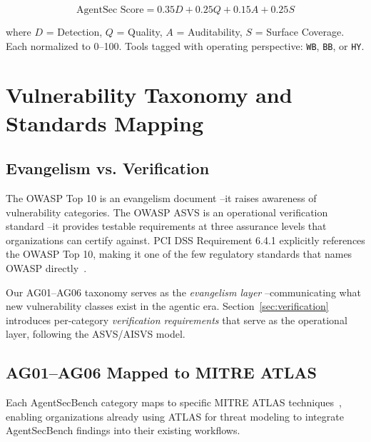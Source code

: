 \documentclass[11pt,twocolumn]{article}
\begin{document}
\begin{equation}
\text{AgentSec Score} = 0.35D + 0.25Q + 0.15A + 0.25S
\end{equation}

\noindent where $D$ = Detection, $Q$ = Quality, $A$ = Auditability, $S$ = Surface Coverage. Each normalized to 0--100. Tools tagged with operating perspective: \texttt{WB}, \texttt{BB}, or \texttt{HY}.

\section{Vulnerability Taxonomy and Standards Mapping}

\subsection{Evangelism vs. Verification}

The OWASP Top 10 is an evangelism document --it raises awareness of vulnerability categories. The OWASP ASVS is an operational verification standard --it provides testable requirements at three assurance levels that organizations can certify against. PCI DSS Requirement 6.4.1 explicitly references the OWASP Top 10, making it one of the few regulatory standards that names OWASP directly~\cite{pcidss2022}.

Our AG01--AG06 taxonomy serves as the \textit{evangelism layer} --communicating what new vulnerability classes exist in the agentic era. Section~\ref{sec:verification} introduces per-category \textit{verification requirements} that serve as the operational layer, following the ASVS/AISVS model.

\subsection{AG01--AG06 Mapped to MITRE ATLAS}

Each AgentSecBench category maps to specific MITRE ATLAS techniques~\cite{atlas2026}, enabling organizations already using ATLAS for threat modeling to integrate AgentSecBench findings into their existing workflows.
\end{document}
